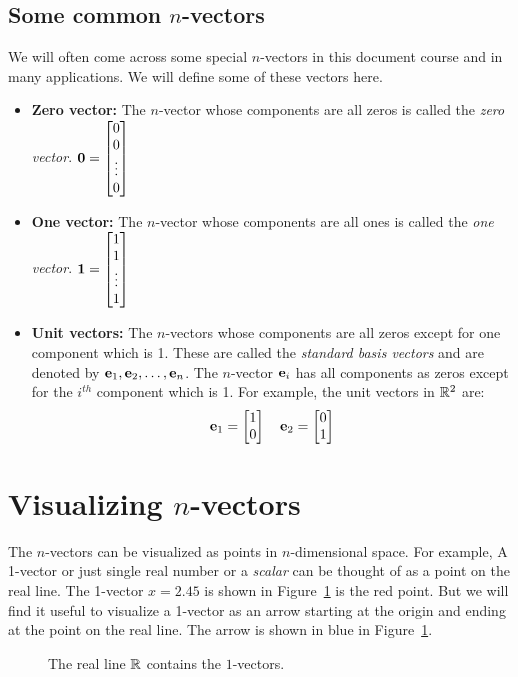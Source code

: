 \subsection{Some common $n$-vectors}
We will often come across some special $n$-vectors in this document course and in many applications. We will define some of these vectors here.
\begin{itemize}
    \item \textbf{Zero vector:} The $n$-vector whose components are all zeros is called the \textit{zero vector}. $\mf{0} = \bmxc 0 \\ 0 \\ \vdots \\ 0\emx$
    \item \textbf{One vector:} The $n$-vector whose components are all ones is called the \textit{one vector}. $\mf{1} = \bmxc 1 \\ 1 \\ \vdots \\ 1\emx$
    \item \textbf{Unit vectors:} The $n$-vectors whose components are all zeros except for one component which is 1. These are called the \textit{standard basis vectors} and are denoted by $\mathbf{e}_1, \mathbf{e}_2, \ldots, \mathbf{e}_n$. The $n$-vector $\mathbf{e}_i$ has all components as zeros except for the $i^{th}$ component which is 1. For example, the unit vectors in $\mathbb{R}^2$ are:
    \[ \mf{e}_1 = \bmx 1 \\ 0\emx \quad \mf{e}_2 = \bmx 0 \\ 1 \emx  \]
\end{itemize}

\section{Visualizing $n$-vectors}
The $n$-vectors can be visualized as points in $n$-dimensional space. For example, A 1-vector or just single real number or a \textit{scalar} can be thought of as a point on the real line. The 1-vector $x = 2.45$ is shown in Figure~\ref{fig:1-vector} is the red point. But we will find it useful to visualize a 1-vector as an arrow starting at the origin and ending at the point on the real line. The arrow is shown in blue in Figure~\ref{fig:1-vector}. 

\begin{figure}[b]
    \centering
    \caption{The real line $\mathbb{R}$ contains the $1$-vectors.}
    \label{fig:1-vector}
\end{figure}

